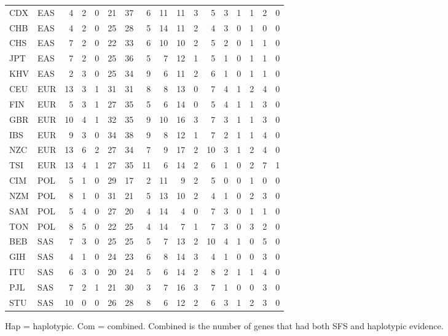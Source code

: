 \documentclass[]{report}
\begin{document}
\begin{table}[!h]
\begin{threeparttable}
\begin{tabular}[t]{llrrrrrrrrrrrrrrr}
CDX & EAS & 4 & 2 & 0 & 21 & 37 & 6 & 11 & 11 & 3 & 5 & 3 & 1 & 1 & 2 & 0\\
CHB & EAS & 4 & 2 & 0 & 25 & 28 & 5 & 14 & 11 & 2 & 4 & 3 & 0 & 1 & 0 & 0\\
CHS & EAS & 7 & 2 & 0 & 22 & 33 & 6 & 10 & 10 & 2 & 5 & 2 & 0 & 1 & 1 & 0\\
JPT & EAS & 7 & 2 & 0 & 25 & 36 & 5 & 7 & 12 & 1 & 5 & 1 & 0 & 1 & 1 & 0\\
KHV & EAS & 2 & 3 & 0 & 25 & 34 & 9 & 6 & 11 & 2 & 6 & 1 & 0 & 1 & 1 & 0\\
CEU & EUR & 13 & 3 & 1 & 31 & 31 & 8 & 8 & 13 & 0 & 7 & 4 & 1 & 2 & 4 & 0\\
FIN & EUR & 5 & 3 & 1 & 27 & 35 & 5 & 6 & 14 & 0 & 5 & 4 & 1 & 1 & 3 & 0\\
GBR & EUR & 10 & 4 & 1 & 32 & 35 & 9 & 10 & 16 & 3 & 7 & 3 & 1 & 1 & 3 & 0\\
IBS & EUR & 9 & 3 & 0 & 34 & 38 & 9 & 8 & 12 & 1 & 7 & 2 & 1 & 1 & 4 & 0\\
NZC & EUR & 13 & 6 & 2 & 27 & 34 & 7 & 9 & 17 & 2 & 10 & 3 & 1 & 2 & 4 & 0\\
TSI & EUR & 13 & 4 & 1 & 27 & 35 & 11 & 6 & 14 & 2 & 6 & 1 & 0 & 2 & 7 & 1\\
CIM & POL & 5 & 1 & 0 & 29 & 17 & 2 & 11 & 9 & 2 & 5 & 0 & 0 & 1 & 0 & 0\\
NZM & POL & 8 & 1 & 0 & 31 & 21 & 5 & 13 & 10 & 2 & 4 & 1 & 0 & 2 & 3 & 0\\
SAM & POL & 5 & 4 & 0 & 27 & 20 & 4 & 14 & 4 & 0 & 7 & 3 & 0 & 1 & 1 & 0\\
TON & POL & 8 & 5 & 0 & 22 & 25 & 4 & 14 & 7 & 1 & 7 & 3 & 0 & 3 & 2 & 0\\
BEB & SAS & 7 & 3 & 0 & 25 & 25 & 5 & 7 & 13 & 2 & 10 & 4 & 1 & 0 & 5 & 0\\
GIH & SAS & 4 & 1 & 0 & 24 & 23 & 6 & 8 & 14 & 3 & 4 & 1 & 0 & 0 & 3 & 0\\
ITU & SAS & 6 & 3 & 0 & 20 & 24 & 5 & 6 & 14 & 2 & 8 & 2 & 1 & 1 & 4 & 0\\
PJL & SAS & 7 & 2 & 1 & 21 & 30 & 3 & 7 & 16 & 3 & 7 & 1 & 0 & 0 & 3 & 0\\
STU & SAS & 10 & 0 & 0 & 26 & 28 & 8 & 6 & 12 & 2 & 6 & 3 & 1 & 2 & 3 & 0\\
\bottomrule
\end{tabular}
\begin{tablenotes}
\item Hap = haplotypic. Com = combined. Combined is the number of genes that had both SFS and haplotypic evidence.
\end{tablenotes}
\end{threeparttable}
\end{table}
\end{document}

